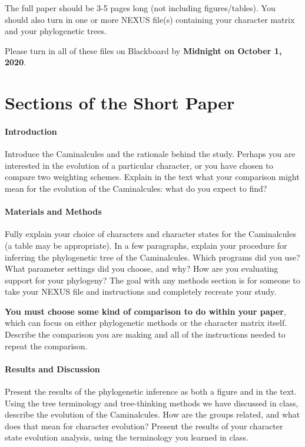 \documentclass[12pt]{article}
\begin{document}
The full paper should be 3-5 pages long (not including figures/tables).
You should also turn in one or more NEXUS file(s) containing your character matrix and your phylogenetic trees.

Please turn in all of these files on Blackboard by \textbf{Midnight on October 1, 2020}.

\section{Sections of the Short Paper}

\paragraph{Introduction}
Introduce the Caminalcules and the rationale behind the study. 
Perhaps you are interested in the evolution of a particular character, or you have chosen to compare two weighting schemes.
Explain in the text what your comparison might mean for the evolution of the Caminalcules: what do you expect to find?

\paragraph{Materials and Methods}
Fully explain your choice of characters and character states for the Caminalcules (a table may be appropriate).
In a few paragraphs, explain your procedure for inferring the phylogenetic tree of the Caminalcules.
Which programs did you use? 
What parameter settings did you choose, and why?
How are you evaluating support for your phylogeny?
The goal with any methods section is for someone to take your NEXUS file and instructions and completely recreate your study.

\textbf{You must choose some kind of comparison to do within your paper}, which can focus on either phylogenetic methods or the character matrix itself.
Describe the comparison you are making and all of the instructions needed to repeat the comparison.


\paragraph{Results and Discussion}
Present the results of the phylogenetic inference as both a figure and in the text.
Using the tree terminology and tree-thinking methods we have discussed in class, describe the evolution of the Caminalcules.
How are the groups related, and what does that mean for character evolution?
Present the results of your character state evolution analysis, using the terminology you learned in class.
\end{document}
